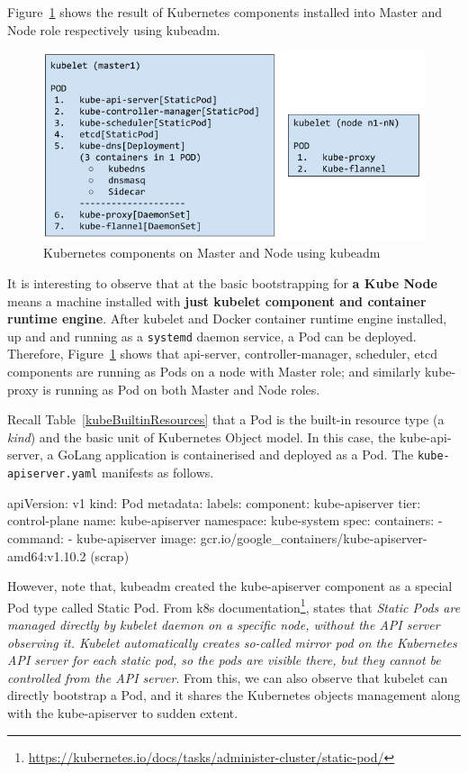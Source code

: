 \noindent Figure~\ref{fig:kubeadm} shows the result of Kubernetes components installed into Master and Node role respectively using kubeadm. 

\begin{figure}[H]
\centering
\includegraphics[width=0.55\paperwidth]{Figures/KUBE_kubeadm}
\decoRule
\caption[Kubernetes components on Master and Node using kubeadm]{Kubernetes components on Master and Node using kubeadm}
\label{fig:kubeadm}
\end{figure}

\noindent It is interesting to observe that at the basic bootstrapping for \textbf{a Kube Node} means a machine installed with \textbf{just kubelet component and container runtime engine}. After kubelet and Docker container runtime engine installed, up and and running as a \verb|systemd| daemon service, a Pod can be deployed. Therefore, Figure~\ref{fig:kubeadm} shows that api-server, controller-manager, scheduler, etcd components are running as Pods on a node with Master role; and similarly kube-proxy is running as Pod on both Master and Node roles.

Recall Table~\ref{kubeBuiltinResources} that a Pod is the built-in resource type (a \emph{kind}) and the basic unit of Kubernetes Object model. In this case, the kube-api-server, a GoLang application is containerised and deployed as a Pod. The \verb|kube-apiserver.yaml| manifests as follows.

\begin{lcverbatim}
apiVersion: v1
kind: Pod
metadata:
  labels:
    component: kube-apiserver
    tier: control-plane
  name: kube-apiserver
  namespace: kube-system
spec:
  containers:
  - command:
    - kube-apiserver
    image: gcr.io/google_containers/kube-apiserver-amd64:v1.10.2
    (scrap)
\end{lcverbatim}

However, note that, kubeadm created the kube-apiserver component as a special Pod type called Static Pod. From k8s documentation\footnote{\url{https://kubernetes.io/docs/tasks/administer-cluster/static-pod/}}, \parencite{kubeDoc} states that \emph{Static Pods are managed directly by kubelet daemon on a specific node, without the API server observing it. Kubelet automatically creates so-called mirror pod on the Kubernetes API server for each static pod, so the pods are visible there, but they cannot be controlled from the API server}. From this, we can also observe that kubelet can directly bootstrap a Pod, and it shares the Kubernetes objects management along with the kube-apiserver to sudden extent.

